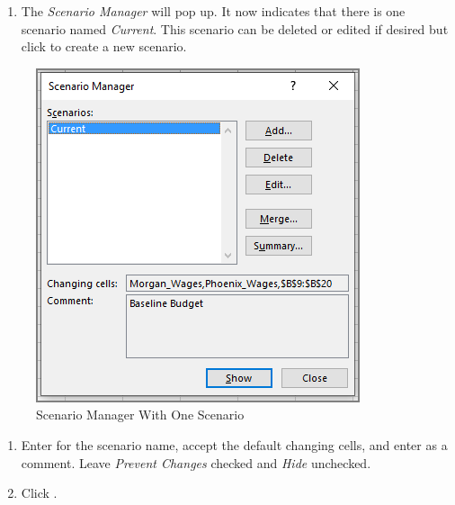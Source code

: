\begin{enumerate}[resume]	
	
	\item The \textit{Scenario Manager} will pop up. It now indicates that there is one scenario named \textit{Current}. This scenario can be deleted or edited if desired but click  to create a new scenario.
	
\end{enumerate}

\begin{figure}[H]
	\centering
	\includegraphics[width=\maxwidth{.65\linewidth}]{gfx/ch08_fig53}
	\caption{Scenario Manager With One Scenario}
	\label{08:fig53}
\end{figure}

\begin{enumerate}[resume]	
	
	\item Enter  for the scenario name, accept the default changing cells, and enter  as a comment. Leave \textit{Prevent Changes} checked and \textit{Hide} unchecked.
	\item Click .
	
\end{enumerate}

